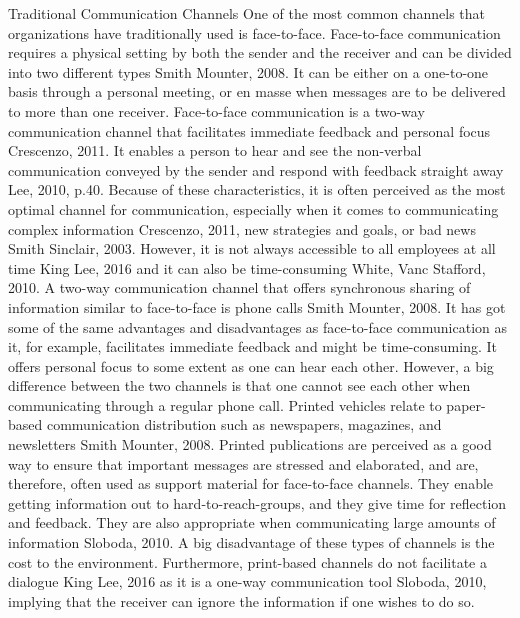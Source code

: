 Traditional Communication Channels
One of the most common channels that organizations have traditionally used is face-to-face. Face-to-face communication requires a physical setting by both the sender and the receiver and can be divided into two different types Smith  Mounter, 2008. It can be either on a one-to-one basis through a personal meeting, or en masse when messages are to be delivered to more than one receiver. Face-to-face communication is a two-way communication channel that facilitates immediate feedback and personal focus Crescenzo, 2011. It enables a person to hear and see the non-verbal communication conveyed by the sender and respond with feedback straight away Lee, 2010, p.40. Because of these characteristics, it is often perceived as the most optimal channel for communication, especially when it comes to communicating complex information Crescenzo, 2011, new strategies and goals, or bad news Smith  Sinclair, 2003. However, it is not always accessible to all employees at all time King  Lee, 2016 and it can also be time-consuming White, Vanc  Stafford, 2010.
A two-way communication channel that offers synchronous sharing of information similar to face-to-face is phone calls Smith  Mounter, 2008. It has got some of the same advantages and disadvantages as face-to-face communication as it, for example, facilitates immediate feedback and might be time-consuming. It offers personal focus to some extent as one can hear each other. However, a big difference between the two channels is that one cannot see each other when communicating through a regular phone call.
Printed vehicles relate to paper-based communication distribution such as newspapers, magazines, and newsletters Smith  Mounter, 2008. Printed publications are perceived as a good way to ensure that important messages are stressed and elaborated, and are, therefore, often used as support material for face-to-face channels. They enable getting information out to hard-to-reach-groups, and they give time for reflection and feedback. They are also appropriate when communicating large amounts of information Sloboda, 2010. A big disadvantage of these types of channels is the cost to the environment. Furthermore, print-based channels do not facilitate a dialogue King  Lee, 2016 as it is a one-way communication tool Sloboda, 2010, implying that the receiver can ignore the information if one wishes to do so.

